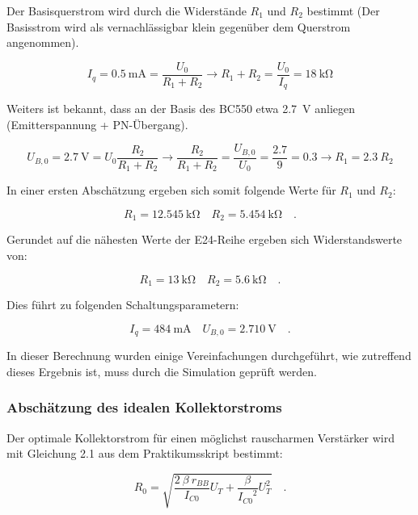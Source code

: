 Der Basisquerstrom wird durch die Widerstände $R_1$ und $R_2$ bestimmt (Der Basisstrom wird als vernachlässigbar klein gegenüber dem Querstrom angenommen).

\begin{equation}
    I_q = \SI{0.5}{\milli \ampere} = \frac{U_0}{R_1 + R_2} \rightarrow R_1 + R_2 = \frac{U_0}{I_q} = \SI{18}{\kilo \ohm}
\end{equation}

Weiters ist bekannt, dass an der Basis des BC550 etwa \SI{2.7}{\volt} anliegen (Emitterspannung + PN-Übergang). 

\begin{equation}
    U_{B,0} = \SI{2.7}{\volt} = U_0 \frac{R_2}{R_1+R_2} \rightarrow \frac{R_2}{R_1+R_2} = \frac{U_{B,0}}{U_0} = \frac{2.7}{9} = 0.3
    \rightarrow R_1 = 2.3 \ R_2
\end{equation}

In einer ersten Abschätzung ergeben sich somit folgende Werte für $R_1$ und $R_2$:

\begin{equation}
    R_1 = \SI{12.545}{\kilo \ohm} \quad R_2 = \SI{5.454}{\kilo \ohm} \quad .
\end{equation}

Gerundet auf die nähesten Werte der E24-Reihe ergeben sich Widerstandswerte von:

\begin{equation}
    R_1 = \SI{13}{\kilo \ohm} \quad R_2 = \SI{5.6}{\kilo \ohm} \quad .
\end{equation}

Dies führt zu folgenden Schaltungsparametern:

\begin{equation}
    I_q = \SI{484}{\milli \ampere} \quad U_{B,0} = \SI{2.710}{\volt} \quad .
\end{equation}

In dieser Berechnung wurden einige Vereinfachungen durchgeführt, wie zutreffend dieses Ergebnis ist, muss durch die Simulation geprüft werden.

\subsubsection{Abschätzung des idealen Kollektorstroms}

Der optimale Kollektorstrom für einen möglichst rauscharmen Verstärker wird mit Gleichung 2.1 aus dem Praktikumsskript bestimmt:

\begin{equation}
    R_0 = \sqrt{\frac{2 \ \beta \  r_{BB}}{I_{C0}}U_T + \frac{\beta}{ {I_{C0}}^2 }U_{T}^2} \quad .
\end{equation}


